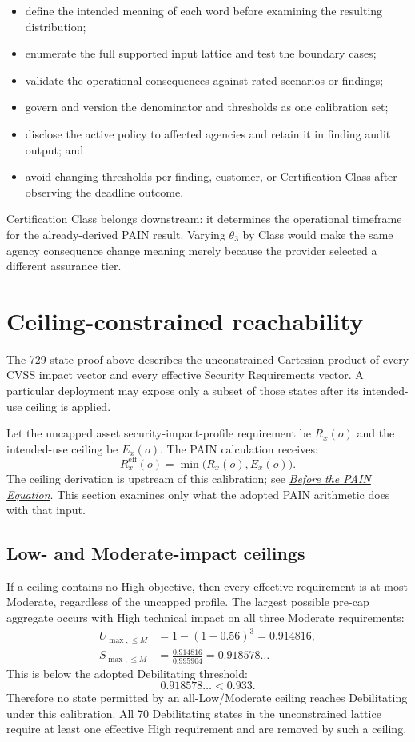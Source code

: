 \documentclass[11pt]{article}
\newcommand{\ceilingpaper}{\href{https://stackarmor.github.io/rfc-fedramp-vdr/vdr-pain-security-requirements.pdf}{\emph{Before the PAIN Equation}}}
\begin{document}
\begin{itemize}[leftmargin=1.5em]
\item define the intended meaning of each word before examining the resulting
  distribution;
\item enumerate the full supported input lattice and test the boundary cases;
\item validate the operational consequences against rated scenarios or findings;
\item govern and version the denominator and thresholds as one calibration set;
\item disclose the active policy to affected agencies and retain it in finding
  audit output; and
\item avoid changing thresholds per finding, customer, or Certification Class after
  observing the deadline outcome.
\end{itemize}

Certification Class belongs downstream: it determines the operational timeframe
for the already-derived PAIN result. Varying $\theta_3$ by Class would make the same
agency consequence change meaning merely because the provider selected a different
assurance tier.

\section{Ceiling-constrained reachability}
\label{sec:ceiling-reachability}

The 729-state proof above describes the unconstrained Cartesian product of every
CVSS impact vector and every effective Security Requirements vector. A particular
deployment may expose only a subset of those states after its intended-use ceiling
is applied.

Let the uncapped asset security-impact-profile requirement be $R_x(o)$ and the
intended-use ceiling be
$E_x(o)$. The PAIN calculation receives:
\[
R_x^{\mathrm{eff}}(o)=\min\big(R_x(o),E_x(o)\big).
\]
The ceiling derivation is upstream of this calibration; see \ceilingpaper{}. This
section examines only what the adopted PAIN arithmetic does with that input.

\subsection{Low- and Moderate-impact ceilings}

If a ceiling contains no High objective, then every effective requirement is at
most Moderate, regardless of the uncapped profile. The largest possible pre-cap aggregate
occurs with High technical impact on all three Moderate requirements:
\begin{align}
U_{\max,\le M}
  &=1-(1-0.56)^3=0.914816,\\
S_{\max,\le M}
  &=\frac{0.914816}{0.995904}=0.918578\ldots
\end{align}
This is below the adopted Debilitating threshold:
\[
0.918578\ldots < 0.933.
\]
Therefore no state permitted by an all-Low/Moderate ceiling reaches Debilitating
under this calibration. All 70 Debilitating states in the unconstrained lattice
require at least one effective High requirement and are removed by such a ceiling.
\end{document}

